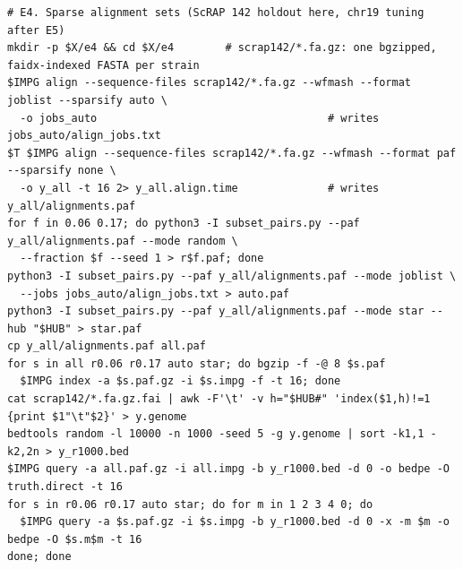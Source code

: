 {\begin{verbatim}
# E4. Sparse alignment sets (ScRAP 142 holdout here, chr19 tuning after E5)
mkdir -p $X/e4 && cd $X/e4        # scrap142/*.fa.gz: one bgzipped, faidx-indexed FASTA per strain
$IMPG align --sequence-files scrap142/*.fa.gz --wfmash --format joblist --sparsify auto \
  -o jobs_auto                                    # writes jobs_auto/align_jobs.txt
$T $IMPG align --sequence-files scrap142/*.fa.gz --wfmash --format paf --sparsify none \
  -o y_all -t 16 2> y_all.align.time              # writes y_all/alignments.paf
for f in 0.06 0.17; do python3 -I subset_pairs.py --paf y_all/alignments.paf --mode random \
  --fraction $f --seed 1 > r$f.paf; done
python3 -I subset_pairs.py --paf y_all/alignments.paf --mode joblist \
  --jobs jobs_auto/align_jobs.txt > auto.paf
python3 -I subset_pairs.py --paf y_all/alignments.paf --mode star --hub "$HUB" > star.paf
cp y_all/alignments.paf all.paf
for s in all r0.06 r0.17 auto star; do bgzip -f -@ 8 $s.paf
  $IMPG index -a $s.paf.gz -i $s.impg -f -t 16; done
cat scrap142/*.fa.gz.fai | awk -F'\t' -v h="$HUB#" 'index($1,h)!=1 {print $1"\t"$2}' > y.genome
bedtools random -l 10000 -n 1000 -seed 5 -g y.genome | sort -k1,1 -k2,2n > y_r1000.bed
$IMPG query -a all.paf.gz -i all.impg -b y_r1000.bed -d 0 -o bedpe -O truth.direct -t 16
for s in r0.06 r0.17 auto star; do for m in 1 2 3 4 0; do
  $IMPG query -a $s.paf.gz -i $s.impg -b y_r1000.bed -d 0 -x -m $m -o bedpe -O $s.m$m -t 16
done; done


\end{verbatim}}
